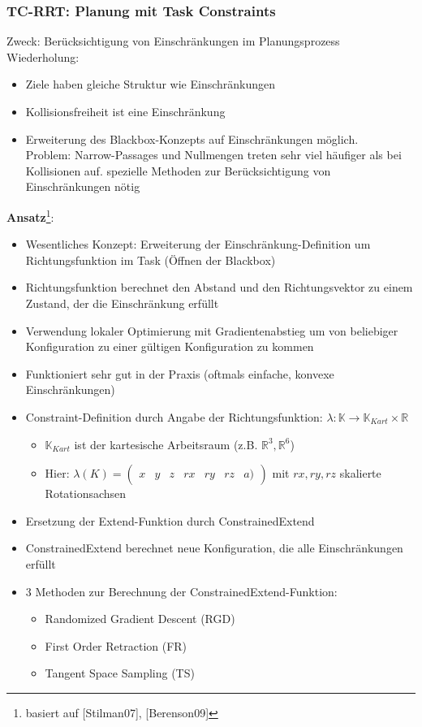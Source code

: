 \subsubsection*{TC-RRT: Planung mit Task Constraints}
Zweck: Berücksichtigung von Einschränkungen im Planungsprozess\\
Wiederholung:
\begin{itemize}
\item Ziele haben gleiche Struktur wie Einschränkungen
\item Kollisionsfreiheit ist eine Einschränkung
\item Erweiterung des Blackbox-Konzepts auf Einschränkungen möglich.\\
Problem: Narrow-Passages und Nullmengen treten sehr viel häufiger als bei Kollisionen auf.
\ita spezielle Methoden zur Berücksichtigung von Einschränkungen nötig
\end{itemize}
\textbf{Ansatz}\footnote{basiert auf [Stilman07], [Berenson09]}:
\begin{itemize}
\item Wesentliches Konzept: Erweiterung der Einschränkung-Definition um Richtungsfunktion im Task (\glqq Öffnen der Blackbox\grqq)
\item Richtungsfunktion berechnet den Abstand und den Richtungsvektor zu einem Zustand, der die Einschränkung erfüllt
\item Verwendung lokaler Optimierung mit Gradientenabstieg um von beliebiger Konfiguration zu einer gültigen Konfiguration zu kommen
\item Funktioniert sehr gut in der Praxis (oftmals einfache, konvexe Einschränkungen)
\item Constraint-Definition durch Angabe der Richtungsfunktion: $\lambda : \mathbb{K} \rightarrow \mathbb{K}_{Kart} \times \mathbb{R}$
\begin{itemize}
\item $\mathbb{K}_{Kart}$ ist der kartesische Arbeitsraum (z.B. $\mathbb{R}^3, \mathbb{R}^6$)
\item Hier: $\lambda(K) = \begin{pmatrix}x &y& z& rx& ry& rz& a)\end{pmatrix}$ mit $rx, ry, rz$ skalierte Rotationsachsen
\end{itemize}
\item Ersetzung der Extend-Funktion durch ConstrainedExtend
\item ConstrainedExtend berechnet neue Konfiguration, die alle Einschränkungen erfüllt
\item 3 Methoden zur Berechnung der ConstrainedExtend-Funktion:
\begin{itemize}
\item Randomized Gradient Descent (RGD)
\item First Order Retraction (FR)
\item Tangent Space Sampling (TS)
\end{itemize}
\end{itemize}
